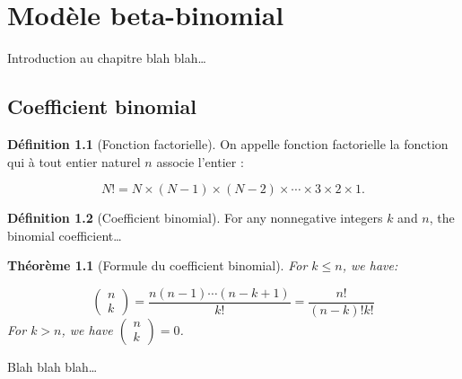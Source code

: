 \documentclass[
  a4paper,11pt,twoside,onecolumn,openright,final,oldfontcommands]{memoir}
\newtheorem{theorem}{Théorème}[chapter]
\theoremstyle{definition}
\newtheorem{definition}{Définition}[chapter]
\theoremstyle{definition}
\theoremstyle{definition}
\theoremstyle{definition}
\theoremstyle{remark}
\begin{document}
\hypertarget{beta-binomial}{%
\chapter{Modèle beta-binomial}\label{beta-binomial}}


Introduction au chapitre blah blah\ldots{}

\hypertarget{coefficient-binomial}{%
\section{Coefficient binomial}\label{coefficient-binomial}}

\begin{definition}[Fonction factorielle]
\protect\hypertarget{def:fonction-factorielle}{}\label{def:fonction-factorielle}On appelle fonction factorielle la fonction qui à tout entier naturel \(n\) associe l'entier :

\[N! = N \times (N - 1) \times (N - 2) \times \cdots \times 3 \times 2 \times 1.\]
\end{definition}

\begin{definition}[Coefficient binomial]
\protect\hypertarget{def:coefficient-binomial}{}\label{def:coefficient-binomial}For any nonnegative integers \(k\) and \(n\), the binomial coefficient\ldots{}
\end{definition}

\begin{theorem}[Formule du coefficient binomial]
\protect\hypertarget{thm:coefficient-binomial-formule}{}\label{thm:coefficient-binomial-formule}For \(k \leq n\), we have:

\[
\left(\begin{array}{l}n \\ k\end{array}\right)=\frac{n(n-1) \cdots(n-k+1)}{k !}=\frac{n !}{(n-k) ! k !}
\]
For \(k > n\), we have \(\left(\begin{array}{l}n \\ k\end{array}\right) = 0\).
\end{theorem}

\begin{note}
Blah blah blah\ldots{}
\end{note}
\end{document}
